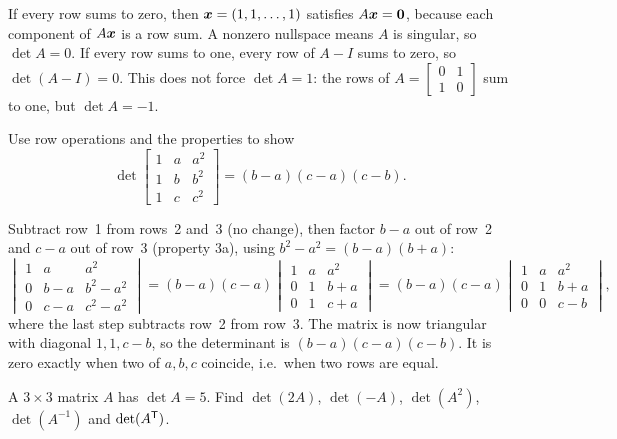 \begin{solution}
If every row sums to zero, then $\boldsymbol{x}=(1,1,\dots,1)$ satisfies $A\boldsymbol{x}=\boldsymbol{0}$, because each
component of $A\boldsymbol{x}$ is a row sum. A nonzero nullspace means $A$ is singular, so
$\det A=0$. If every row sums to one, every row of $A-I$ sums to zero, so $\det(A-I)=0$. This
does not force $\det A=1$: the rows of $A=\left[\begin{smallmatrix}0&1\\1&0\end{smallmatrix}\right]$
sum to one, but $\det A=-1$.
\end{solution}

\begin{exercise}\label{ex:u20-vandermonde}
Use row operations and the properties to show
\[
  \det\begin{bmatrix}1&a&a^2\\1&b&b^2\\1&c&c^2\end{bmatrix}=(b-a)(c-a)(c-b).
\]
\end{exercise}

\begin{solution}
Subtract row~1 from rows~2 and~3 (no change), then factor $b-a$ out of row~2 and $c-a$ out of
row~3 (property 3a), using $b^2-a^2=(b-a)(b+a)$:
\[
  \begin{vmatrix}1&a&a^2\\0&b-a&b^2-a^2\\0&c-a&c^2-a^2\end{vmatrix}
  =(b-a)(c-a)\begin{vmatrix}1&a&a^2\\0&1&b+a\\0&1&c+a\end{vmatrix}
  =(b-a)(c-a)\begin{vmatrix}1&a&a^2\\0&1&b+a\\0&0&c-b\end{vmatrix},
\]
where the last step subtracts row~2 from row~3. The matrix is now triangular with diagonal
$1,1,c-b$, so the determinant is $(b-a)(c-a)(c-b)$. It is zero exactly when two of $a,b,c$
coincide, i.e.\ when two rows are equal.
\end{solution}

\begin{exercise}\label{ex:u20-scaling}
A $3\times 3$ matrix $A$ has $\det A=5$. Find $\det(2A)$, $\det(-A)$, $\det(A^2)$,
$\det(A^{-1})$ and $\det(A^{\mathsf{T}})$.
\end{exercise}

